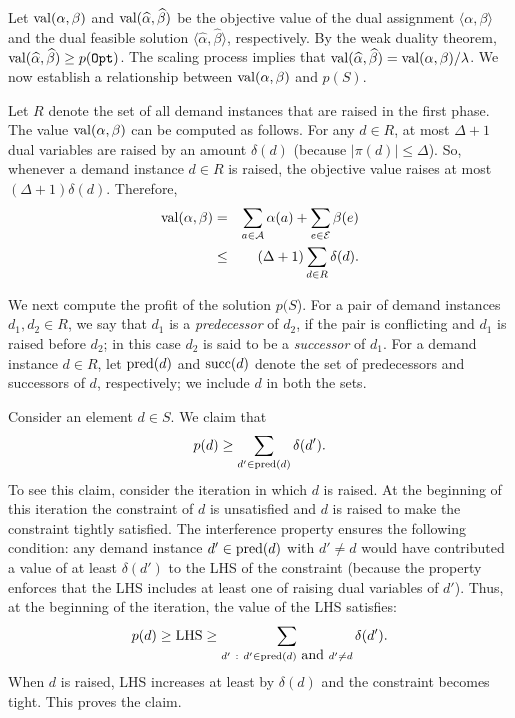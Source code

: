\documentclass[11pt]{article}
\newcommand{\calA} {{\cal A}}
\newcommand{\calE} {{\cal E}}
\newcommand{\wh}[1] {\widehat{#1}}
\newcommand{\Opt} {{\tt Opt}}
\newcommand{\val} {{\rm val}}
\newcommand{\mypred} {{\rm pred}}
\newcommand{\mysucc} {{\rm succ}}
\begin{document}
Let $\val(\alpha, \beta)$ and $\val(\wh{\alpha},\wh{\beta})$ be the objective
value of the dual assignment $\langle \alpha, \beta \rangle$
and the dual feasible solution $\langle \wh{\alpha},\wh{\beta}\rangle$,
respectively. By the weak duality theorem, $\val(\wh{\alpha},\wh{\beta}) \geq p(\Opt)$.
The scaling process implies that $\val(\wh{\alpha},\wh{\beta}) = \val(\alpha,\beta)/\lambda$.
We now establish a relationship between $\val(\alpha,\beta)$ and $p(S)$.

Let $R$ denote the set of all demand instances that are raised in the first phase.
The value $\val(\alpha,\beta)$ can be computed as follows.
For any $d\in R$, at most $\Delta+1$ dual variables are raised by an amount $\delta(d)$ (because $|\pi(d)|\leq \Delta$).
So, whenever a demand instance $d\in R$ is raised, the objective value raises at most $(\Delta+1)\delta(d)$.
Therefore,
\begin{eqnarray}
\nonumber
\val(\alpha,\beta) 
&=& \sum_{a\in \calA} \alpha(a) + \sum_{e\in \calE} \beta(e)\\
\label{eqn:AAA}
&\leq& (\Delta+1)\sum_{d\in R} \delta(d).
\end{eqnarray}

We next compute the profit of the solution $p(S$).
For a pair of demand instances $d_1, d_2\in R$, we say that $d_1$ is a {\em predecessor} of $d_2$,
if the pair is conflicting and $d_1$ is raised before $d_2$; in this case $d_2$ is said to be a {\em successor} of $d_1$.
For a demand instance $d\in R$, let $\mypred(d)$ and $\mysucc(d)$ denote the set of predecessors and successors of $d$,
respectively; we include $d$ in both the sets.

Consider an element $d\in S$. We claim that 
\begin{eqnarray}
\label{eqn:BBB}
p(d) \geq \sum_{d'\in \mypred(d)} \delta(d').
\end{eqnarray}
To see this claim, consider the iteration in which $d$ is raised.
At the beginning of this iteration the constraint of $d$ is unsatisfied 
and $d$ is raised to make the constraint tightly satisfied.
The interference property ensures the following condition:
any demand instance $d'\in \mypred(d)$ with $d'\neq d$ would have contributed a value of at least $\delta(d')$
to the LHS of the constraint (because the property enforces that the LHS includes at least one of raising dual variables
of $d'$). Thus, at the beginning of the iteration, the value of the LHS satisfies:
\[
p(d) \geq {\rm LHS} \geq \sum_{d'~:~d'\in \mypred(d) \mbox{~and~}d'\neq d} \delta(d').
\]
When $d$ is raised, LHS increases at least by $\delta(d)$ and the constraint becomes tight.
This proves the claim.
\end{document}
